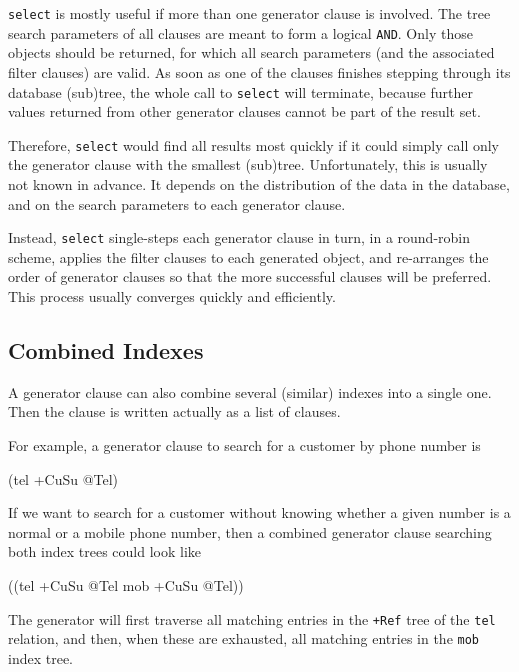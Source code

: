 \texttt{select} is mostly useful if more than one generator clause is involved.
The tree search parameters of all clauses are meant to form a logical
\texttt{AND}. Only those objects should be returned, for which all search
parameters (and the associated filter clauses) are valid. As soon as one
of the clauses finishes stepping through its database (sub)tree, the
whole call to \texttt{select} will terminate, because further values returned
from other generator clauses cannot be part of the result set.

Therefore, \texttt{select} would find all results most quickly if it could
simply call only the generator clause with the smallest (sub)tree.
Unfortunately, this is usually not known in advance. It depends on the
distribution of the data in the database, and on the search parameters
to each generator clause.

Instead, \texttt{select} single-steps each generator clause in turn, in a
round-robin scheme, applies the filter clauses to each generated object,
and re-arranges the order of generator clauses so that the more
successful clauses will be preferred. This process usually converges
quickly and efficiently.

 
\subsection{Combined Indexes}
\label{sec:select-pred-combined-indexes}


A generator clause can also combine several (similar) indexes into a
single one. Then the clause is written actually as a list of clauses.

For example, a generator clause to search for a customer by phone number
is


\begin{wideverbatim}
(tel +CuSu @Tel)
\end{wideverbatim}

If we want to search for a customer without knowing whether a given
number is a normal or a mobile phone number, then a combined generator
clause searching both index trees could look like


\begin{wideverbatim}
((tel +CuSu @Tel  mob +CuSu @Tel))
\end{wideverbatim}

The generator will first traverse all matching entries in the \texttt{+Ref}
tree of the \texttt{tel} relation, and then, when these are exhausted, all
matching entries in the \texttt{mob} index tree.

